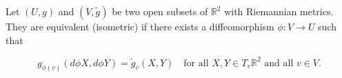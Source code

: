 Let $(U, g)$ and $(V, \tilde{g})$ be two open subsets of $\mathbb{R}^2$ with Riemannian metrics. They are equivalent (isometric) if there exists a diffeomorphism $\phi: V \rightarrow U$ such that

$$g_{\phi(v)}(d\phi X, d\phi Y) = \tilde{g}_v(X, Y) \quad \text{for all } X, Y \in T_v \mathbb{R}^2 \text{ and all } v \in V.$$
